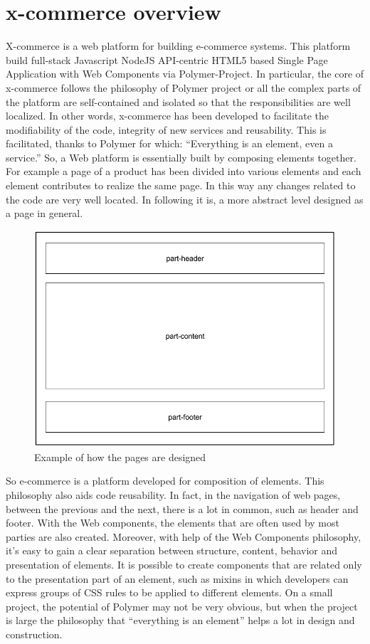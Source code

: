 \section{x-commerce overview}
\label{sec:x_commerce_overview}
X-commerce is a web platform for building e-commerce systems. This platform build full-stack Javascript NodeJS API-centric HTML5 based Single Page Application with Web Components via Polymer-Project. In particular, the core of x-commerce follows the philosophy of Polymer project or all the complex parts of the platform are self-contained and isolated so that the responsibilities are well localized. In other words, x-commerce has been developed to facilitate the modifiability of the code, integrity of new services and reusability. This is facilitated, thanks to Polymer for which: “Everything is an element, even a service.”
So, a Web platform is essentially built by composing elements together.
\newline
For example a page of a product has been divided into various elements and each element contributes to realize the same page. In this way any changes related to the code are very well located. In following it is, a more abstract level designed as a page in general.
\newpage
\begin{figure}[htb]
 \centering
 \includegraphics[width=1.0\linewidth]{images/chapter4/design-page.png}\hfill
 \caption[Design page]{Example of how the pages are designed}
 \label{fig:design_page}
\end{figure}
So e-commerce is a platform developed for composition of elements. This philosophy also aids code reusability. In fact, in the navigation of web pages, between the previous and the next, there is a lot in common, such as header and footer. With the Web components, the elements that are often used by most parties are also created.
Moreover, with help of the Web Components philosophy, it’s easy to gain a clear separation between structure, content, behavior and presentation of elements. It is possible to create components that are related only to the presentation part of an element, such as mixins in which developers can express groups of CSS rules to be applied to different elements.
\newline
On a small project, the potential of Polymer may not be very obvious, but when the project is large the philosophy that “everything is an element” helps a lot in design and construction.